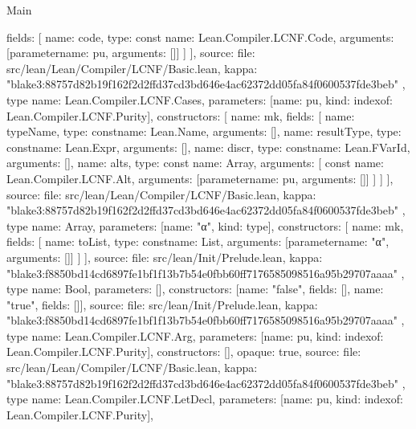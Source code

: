 \begin{lexlean}{Main}
\begin{toolingmodule}
{{{          fields: [
            {
              name: code,
              type: const{
                name: Lean.Compiler.LCNF.Code,
                arguments: [parameter{name: pu, arguments: []}]
              }
            }
          ]
        }
      ],
      source: {
        file: src/lean/Lean/Compiler/LCNF/Basic.lean,
        kappa: "blake3:88757d82b19f162f2d2ffd37cd3bd646e4ac62372dd05fa84f0600537fde3beb"
      }
    },
    type{
      name: Lean.Compiler.LCNF.Cases,
      parameters: [{name: pu, kind: index{of: Lean.Compiler.LCNF.Purity}}],
      constructors: [
        {
          name: mk,
          fields: [
            {name: typeName, type: const{name: Lean.Name, arguments: []}},
            {name: resultType, type: const{name: Lean.Expr, arguments: []}},
            {name: discr, type: const{name: Lean.FVarId, arguments: []}},
            {
              name: alts,
              type: const{
                name: Array,
                arguments: [
                  const{
                    name: Lean.Compiler.LCNF.Alt,
                    arguments: [parameter{name: pu, arguments: []}]
                  }
                ]
              }
            }
          ]
        }
      ],
      source: {
        file: src/lean/Lean/Compiler/LCNF/Basic.lean,
        kappa: "blake3:88757d82b19f162f2d2ffd37cd3bd646e4ac62372dd05fa84f0600537fde3beb"
      }
    },
    type{
      name: Array,
      parameters: [{name: "α", kind: type{}}],
      constructors: [
        {
          name: mk,
          fields: [
            {
              name: toList,
              type: const{name: List, arguments: [parameter{name: "α", arguments: []}]}
            }
          ]
        }
      ],
      source: {
        file: src/lean/Init/Prelude.lean,
        kappa: "blake3:f8850bd14cd6897fe1bf1f13b7b54e0fbb60ff7176585098516a95b29707aaaa"
      }
    },
    type{
      name: Bool,
      parameters: [],
      constructors: [{name: "false", fields: []}, {name: "true", fields: []}],
      source: {
        file: src/lean/Init/Prelude.lean,
        kappa: "blake3:f8850bd14cd6897fe1bf1f13b7b54e0fbb60ff7176585098516a95b29707aaaa"
      }
    },
    type{
      name: Lean.Compiler.LCNF.Arg,
      parameters: [{name: pu, kind: index{of: Lean.Compiler.LCNF.Purity}}],
      constructors: [],
      opaque: true,
      source: {
        file: src/lean/Lean/Compiler/LCNF/Basic.lean,
        kappa: "blake3:88757d82b19f162f2d2ffd37cd3bd646e4ac62372dd05fa84f0600537fde3beb"
      }
    },
    type{
      name: Lean.Compiler.LCNF.LetDecl,
      parameters: [{name: pu, kind: index{of: Lean.Compiler.LCNF.Purity}}],
}}
\end{toolingmodule}
\end{lexlean}
